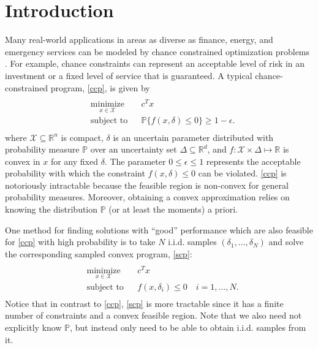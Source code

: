 \documentclass[12pt]{article}
\begin{document}
\section*{Introduction}
Many real-world applications in areas as diverse as finance, energy, and emergency services can be modeled by chance constrained optimization problems \cite{bental09}.
For example, chance constraints can represent an acceptable level of risk in an investment or a fixed level of service that is guaranteed.
A typical chance-constrained program, \ref{ccp}, is given by
\begin{align}\label{ccp}
\begin{split}
\begin{aligned}
    & \underset{x \in \mathcal{X}}{\text{minimize}}
    & & c^T x \\
    & \text{subject to}
    & & \mathbb{P}\{f(x,\delta) \leq 0\} \geq 1-\epsilon.
\end{aligned}
\end{split} \tag{CCP$_\epsilon$}
\end{align}
where $\mathcal{X} \subseteq \mathbb{R}^n$ is compact, $\delta$ is an uncertain parameter distributed with probability measure $\mathbb{P}$ over an uncertainty set $\Delta \subseteq \mathbb{R}^d$, and $f:\mathcal{X} \times \Delta \mapsto \mathbb{R}$ is convex in $x$ for any fixed $\delta$.
The parameter $0 \leq \epsilon \leq 1$ represents the acceptable probability with which the constraint $f(x,\delta) \leq 0$ can be violated.
\ref{ccp} is notoriously intractable because the feasible region is non-convex for general probability measures.
Moreover, obtaining a convex approximation relies on knowing the distribution $\mathbb{P}$ (or at least the moments) a priori.

One method for finding solutions with ``good'' performance which are also feasible for \ref{ccp} with high probability is to take $N$ i.i.d. samples $(\delta_1, \ldots, \delta_N)$ and solve the corresponding sampled convex program, \ref{scp}:
\begin{align}\label{scp}
\begin{split}
\begin{aligned}
    & \underset{x \in \mathcal{X}}{\text{minimize}}
    & & c^T x \\
    & \text{subject to}
    & & f(x,\delta_i) \leq 0 \quad i = 1, \ldots, N.
\end{aligned}
\end{split} \tag{SCP$_N$}
\end{align}
Notice that in contrast to \ref{ccp}, \ref{scp} is more tractable since it has a finite number of constraints and a convex feasible region. Note that we also need not explicitly know $\mathbb{P}$, but instead only need to be able to obtain i.i.d. samples from it.
\end{document}
